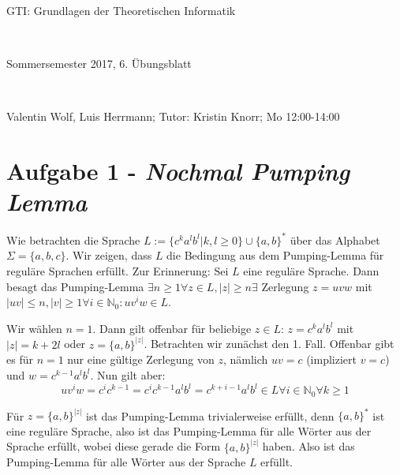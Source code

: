 \documentclass{article}
\begin{document}
	
	\setlength{\parindent}{0em} 
	
	\hrulefill
	\begin{center}
		\bfseries %
		\sffamily %
		\begin{huge}
			GTI: Grundlagen der Theoretischen Informatik
		\end{huge}\\
		\begin{Large}
			Sommersemester 2017, 6. Übungsblatt
		\end{Large}\\
		\begin{small}
			Valentin Wolf, Luis Herrmann; Tutor: Kristin Knorr; Mo 12:00-14:00
		\end{small}
		
		\vspace{-10pt}
	\end{center}
	\hrulefill
	
\section*{Aufgabe 1 - \textit{Nochmal Pumping Lemma}}

Wie betrachten die Sprache $L := \{c^k a^l b^l | k,l \ge 0 \} \cup \{a,b\}^*$ über das Alphabet $\Sigma = \{a,b,c\}$. Wir zeigen, dass $L$ die Bedingung aus dem Pumping-Lemma für reguläre Sprachen erfüllt. Zur Erinnerung: Sei $L$ eine reguläre Sprache. Dann besagt das Pumping-Lemma $\exists n\ge 1 \forall z\in L , |z| \ge n \exists $ Zerlegung $z = uvw$ mit $|uv| \le n, |v| \ge 1 \forall i \in \mathbb{N}_0: uv^iw \in L$.

Wir wählen $n =1 $. Dann gilt offenbar für beliebige $z \in L $: $z = c^k a^l b^l$ mit $|z| = k+2l$ oder $z = \{a,b\}^{|z|}$. Betrachten wir zunächst den 1. Fall. Offenbar gibt es für $n=1$ nur eine gültige Zerlegung von $z$, nämlich $uv = c$ (impliziert $v = c$) und $w = c^{k-1}a^l b^l$. Nun gilt aber:
\begin{equation}
	uv^i w = c^i c^{k-1} = c^i c^{k-1}a^l b^l = c^{k+i-1}a^l b^l \in L \forall i\in \mathbb{N}_0 \forall k\ge 1
\end{equation}

Für $z = \{a,b\}^{|z|}$ ist das Pumping-Lemma trivialerweise erfüllt, denn $\{a,b\}^*$ ist eine reguläre Sprache, also ist das Pumping-Lemma für alle Wörter aus der Sprache erfüllt, wobei diese gerade die Form $\{a,b\}^{|z|}$ haben. Also ist das Pumping-Lemma für alle Wörter aus der Sprache $L$ erfüllt.\\
\end{document}
